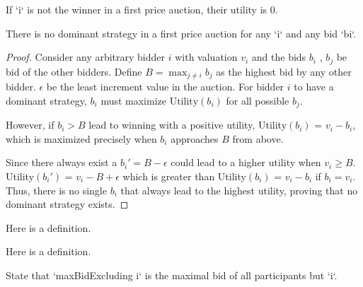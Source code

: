 \begin{lemma}\label{FirstPrice.utility_loser}
    \leanok
    If `i` is not the winner in a first price auction, their utility is 0.
\end{lemma}


\begin{theorem}\label{FirstPrice.firstprice_auction_has_no_dominant_strategy}
    \leanok
    There is no dominant strategy in a first price auction for any `i` and any bid `bi`.
\end{theorem}
\begin{proof}
Consider any arbitrary bidder \(i\) with valuation \(v_i\) and the bids \(b_i\) ,  \(b_{j}\) be bid of the other bidders. Define \(B = \max_{j \neq i} b_j\) as the highest bid by any other bidder. \(\epsilon\) be the least increment value in the auction. For bidder \(i\) to have a dominant strategy, \(b_i\) must maximize \(\text{Utility}(b_i)\) for all possible \(b_{j}\).

However, if \(b_i > B\) lead to winning with a positive utility, Utility\((b_i)\) =  \(v_i - b_i\), which is maximized precisely when \(b_i\) approaches \(B\) from above. 

Since there always exist a \(b_i' = B - \epsilon\) could lead to a higher utility when \(v_i \ge B\). Utility\((b_i')\) = \(v_i - B + \epsilon\) which is greater than Utility\((b_i)\) =  \(v_i - b_i\) if \(b_i = v_i\).  Thus, there is no single \(b_i\) that always lead to the highest utility, proving that no dominant strategy exists.
\end{proof}

\begin{definition}\label{Finset.univ_nontrivial_iff}
     \leanok
     Here is a definition.
 \end{definition}

 \begin{definition}\label{Finset.univ_nontrivial}
     \leanok
     Here is a definition.
 \end{definition}


\begin{definition}\label{maxBidExcluding}
    \leanok
    State that `maxBidExcluding i` is the maximal bid of all participants but `i`.
\end{definition}

